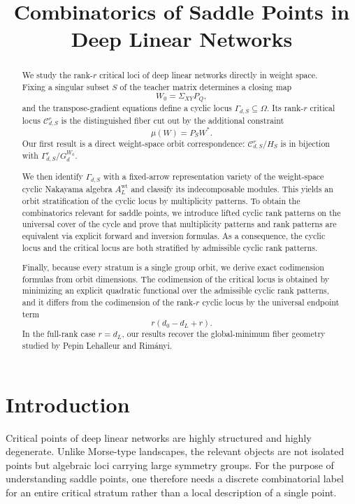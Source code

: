 \documentclass[11pt]{article}
\title{Combinatorics of Saddle Points in Deep Linear Networks}
\author{}
\date{}
\theoremstyle{definition}
\begin{document}
\maketitle

\begin{abstract}
We study the rank-\(r\) critical loci of deep linear networks directly in weight
space. Fixing a singular subset \(S\) of the teacher matrix determines a closing
map
\[
W_0=\Sigma_{XY}P_Q,
\]
and the transpose-gradient equations define a cyclic locus
\(\Gamma_{d,S}\subseteq \Omega\). Its rank-\(r\) critical locus
\(\mathcal C_{d,S}^r\) is the distinguished fiber cut out by the additional
constraint
\[
\mu(W)=P_SW^\ast.
\]
Our first result is a direct weight-space orbit correspondence:
\(\mathcal C_{d,S}^r/H_S\) is in bijection with \(\Gamma_{d,S}^r/G_d^{W_0}\).

We then identify \(\Gamma_{d,S}\) with a fixed-arrow representation variety of
the weight-space cyclic Nakayama algebra \(A_L^{\mathrm{wt}}\) and classify its
indecomposable modules. This yields an orbit stratification of the cyclic locus
by multiplicity patterns. To obtain the combinatorics relevant for saddle
points, we introduce lifted cyclic rank patterns on the universal cover of the
cycle and prove that multiplicity patterns and rank patterns are equivalent via
explicit forward and inversion formulas. As a consequence, the cyclic locus and
the critical locus are both stratified by admissible cyclic rank patterns.

Finally, because every stratum is a single group orbit, we derive exact
codimension formulas from orbit dimensions. The codimension of the critical
locus is obtained by minimizing an explicit quadratic functional over the
admissible cyclic rank patterns, and it differs from the codimension of the
rank-\(r\) cyclic locus by the universal endpoint term
\[
r(d_0-d_L+r).
\]
In the full-rank case \(r=d_L\), our results recover the global-minimum fiber
geometry studied by Pepin Lehalleur and Rim\'anyi.
\end{abstract}

\tableofcontents

\section{Introduction}

Critical points of deep linear networks are highly structured and highly
degenerate. Unlike Morse-type landscapes, the relevant objects are not isolated
points but algebraic loci carrying large symmetry groups. For the purpose of
understanding saddle points, one therefore needs a discrete combinatorial label
for an entire critical stratum rather than a local description of a single
point.
\end{document}
